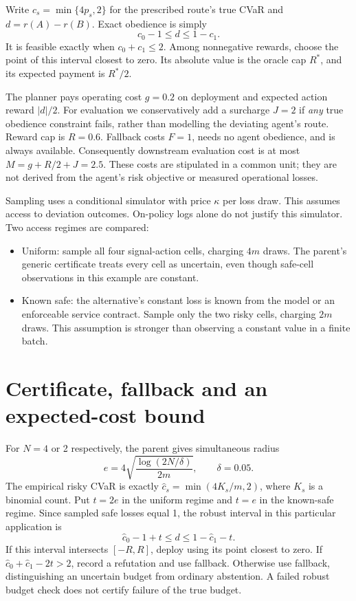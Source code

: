 \documentclass[11pt,a4paper]{article}
\begin{document}
Write \(c_s=\min\{4p_s,2\}\) for the prescribed route's true CVaR and
\(d=r(A)-r(B)\). Exact obedience is simply
\[
 c_0-1\leq d\leq 1-c_1.
\]
It is feasible exactly when \(c_0+c_1\leq2\). Among nonnegative rewards,
choose the point of this interval closest to zero. Its absolute value is
the oracle cap \(R^*\), and its expected payment is \(R^*/2\).

The planner pays operating cost \(g=0.2\) on deployment and expected
action reward \(|d|/2\). For evaluation we conservatively add a surcharge
\(J=2\) if \emph{any} true obedience constraint fails, rather than
modelling the deviating agent's route. Reward cap is \(R=0.6\).
Fallback costs \(F=1\), needs no agent obedience, and is always available.
Consequently downstream evaluation cost is at most
\(M=g+R/2+J=2.5\). These costs are stipulated in a common unit; they are
not derived from the agent's risk objective or measured operational losses.

Sampling uses a conditional simulator with price \(\kappa\) per loss draw.
This assumes access to deviation outcomes. On-policy logs alone do not
justify this simulator. Two access regimes are compared:
\begin{itemize}
\item Uniform: sample all four signal-action cells, charging \(4m\) draws.
  The parent's generic certificate treats every cell as uncertain, even
  though safe-cell observations in this example are constant.
\item Known safe: the alternative's constant loss is known from the model
  or an enforceable service contract. Sample only the two risky cells,
  charging \(2m\) draws. This assumption is stronger than observing a
  constant value in a finite batch.
\end{itemize}

\section{Certificate, fallback and an expected-cost bound}

For \(N=4\) or 2 respectively, the parent gives simultaneous radius
\[
 e=4\sqrt{\frac{\log(2N/\delta)}{2m}},\qquad \delta=0.05.
\]
The empirical risky CVaR is exactly \(\widehat c_s=\min(4K_s/m,2)\),
where \(K_s\) is a binomial count. Put \(t=2e\) in the uniform regime
and \(t=e\) in the known-safe regime. Since sampled safe losses equal 1,
the robust interval in this particular application is
\[
 \widehat c_0-1+t\leq d\leq 1-\widehat c_1-t.
\]
If this interval intersects \([-R,R]\), deploy using its point closest
to zero. If \(\widehat c_0+\widehat c_1-2t>2\), record a refutation
and use fallback. Otherwise use fallback, distinguishing an uncertain
budget from ordinary abstention. A failed robust budget check does not
certify failure of the true budget.
\end{document}
